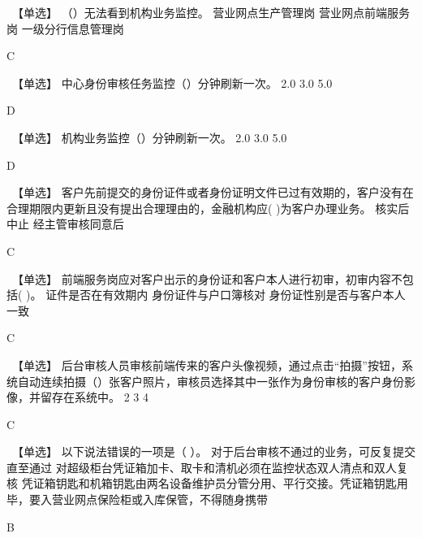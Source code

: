 \documentclass[kindlepaper]{BHCexam4kindle}
\begin{document}
\begin{questions}
\qs　【单选】 （）无法看到机构业务监控。 \xx
{} {  营业网点生产管理岗 } { 营业网点前端服务岗 } { 一级分行信息管理岗 }
\begin{solution} C \end{solution}
\qs　【单选】 中心身份审核任务监控（）分钟刷新一次。 \xx
{} {  2.0 } { 3.0 } { 5.0 }
\begin{solution} D \end{solution}
\qs　【单选】 机构业务监控（）分钟刷新一次。 \xx
{} {  2.0 } { 3.0 } { 5.0 }
\begin{solution} D \end{solution}
\qs　【单选】 客户先前提交的身份证件或者身份证明文件已过有效期的，客户没有在合理期限内更新且没有提出合理理由的，金融机构应(    )为客户办理业务。 \xx
{} {  核实后 } { 中止 } { 经主管审核同意后 }
\begin{solution} C \end{solution}
\qs　【单选】 前端服务岗应对客户出示的身份证和客户本人进行初审，初审内容不包括(    )。 \xx
{} {  证件是否在有效期内 } { 身份证件与户口簿核对 } { 身份证性别是否与客户本人一致 }
\begin{solution} C \end{solution}
\qs　【单选】 后台审核人员审核前端传来的客户头像视频，通过点击“拍摄”按钮，系统自动连续拍摄（）张客户照片，审核员选择其中一张作为身份审核的客户身份影像，并留存在系统中。 \xx
{} {  2 } { 3 } { 4 }
\begin{solution} C \end{solution}
\qs　【单选】 以下说法错误的一项是（  ）。 \xx
{} {  对于后台审核不通过的业务，可反复提交直至通过 } { 对超级柜台凭证箱加卡、取卡和清机必须在监控状态双人清点和双人复核 } { 凭证箱钥匙和机箱钥匙由两名设备维护员分管分用、平行交接。凭证箱钥匙用毕，要入营业网点保险柜或入库保管，不得随身携带 }
\begin{solution} B \end{solution}

\end{questions}
\end{document}

